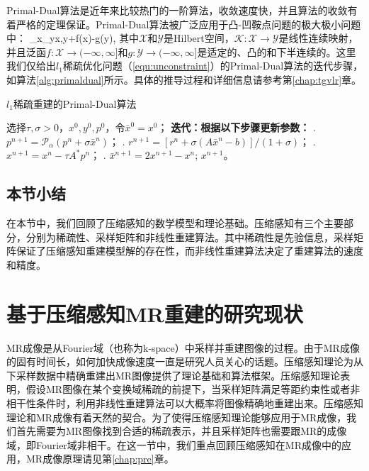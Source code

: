 Primal-Dual\cite{pd}算法是近年来比较热门的一阶算法，收敛速度快，并且算法的收敛有着严格的定理保证。Primal-Dual算法被广泛应用于凸-凹鞍点问题的极大极小问题中：
\beq
\min_{x\in{}}\max_{y\in{}}\quad\langle {}x,y\rangle+f(x)-g(y),
\label{equ:saddle1}
\eeq
其中$\mathcal{X}$和$\mathcal{Y}$是Hilbert空间，$\mathcal{K}:\mathcal{X}\rightarrow\mathcal{Y}$是线性连续映射，并且泛函$f:\mathcal{X}\rightarrow(-\infty,\infty]$和$g:\mathcal{Y}\rightarrow(-\infty,\infty]$是适定的、凸的和下半连续的。这里我们仅给出$l_1$稀疏优化问题（\ref{equ:unconstraint}）的Primal-Dual算法的迭代步骤，如算法\ref{alg:primaldual}所示。具体的推导过程和详细信息请参考第\ref{chap:tgvlr}章。
\begin{algorithm}
	\caption{$l_1$稀疏重建的Primal-Dual算法}
	\label{alg:primaldual}
	\begin{algorithmic}
		\REQUIRE 选择$\tau, \sigma>0$，$x^0,y^0,p^0$，令$\bar{x}^0=x^0$；
		\INDSTATE[-1.25] \textbf{迭代：根据以下步骤更新参数：}	
		. $p^{n+1}=\mathcal{P}_\alpha(p^n+\sigma\bar{x}^n)$；
		. $r^{n+1}=[r^n+\sigma(A\bar{x}^n-b)]/(1+\sigma)$；
		. $x^{n+1}=x^n-\tau A^*p^n$；
		. $\bar{x}^{n+1}=2x^{n+1}-x^n$;
		\ENSURE $x^{n+1}$。
	\end{algorithmic}
\end{algorithm}

\subsection{本节小结}
在本节中，我们回顾了压缩感知的数学模型和理论基础。压缩感知有三个主要部分，分别为稀疏性、采样矩阵和非线性重建算法。其中稀疏性是先验信息，采样矩阵保证了压缩感知重建模型解的存在性，而非线性重建算法决定了重建算法的速度和精度。

\section{基于压缩感知MR重建的研究现状}
\label{sec:csmri}
MR成像是从Fourier域（也称为k-space）中采样并重建图像的过程。由于MR成像的固有时间长，如何加快成像速度一直是研究人员关心的话题。压缩感知理论为从下采样数据中精确重建出MR图像提供了理论基础和算法框架。压缩感知理论表明，假设MR图像在某个变换域稀疏的前提下，当采样矩阵满足等距约束性或者非相干性条件时\cite{Donoho2006Compressed}，利用非线性重建算法可以大概率将图像精确地重建出来。压缩感知理论和MR成像有着天然的契合。为了使得压缩感知理论能够应用于MR成像，我们首先需要为MR图像找到合适的稀疏表示，并且采样矩阵也需要跟MR的成像域，即Fourier域非相干。在这一节中，我们重点回顾压缩感知在MR成像中的应用，MR成像原理请见第\ref{chap:pre}章。

